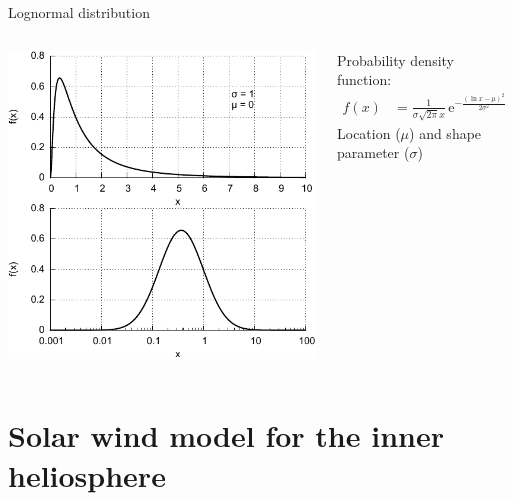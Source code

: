 \begin{frame}[c,label=lognormal_distribution]{Lognormal distribution}{}
	\begin{columns}[c]
		
	\includegraphics[width=\textwidth]{../figures_of_mine/gnuplots/lognormal_semi_log.pdf}

	
	Probability density function:
	\begin{align}
		f(x) &= \frac{1}{\sigma \sqrt{2 \pi} x} \, \text{e}^{- \frac{(\ln x - \mu)^2}{2 \sigma^2}}	\nonumber
	\end{align}
	Location ($\mu$) and shape parameter ($\sigma$)
	
	\end{columns}
\end{frame}

\section{Solar wind model for the inner heliosphere}

